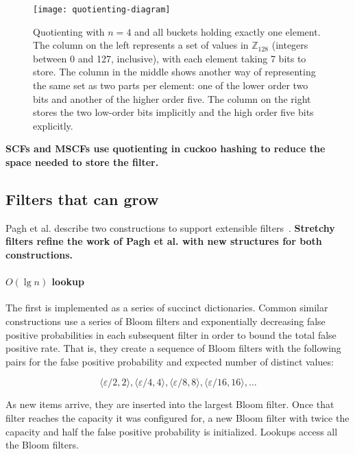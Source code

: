 \documentclass[letterpaper,twocolumn,10pt]{article}
\newcommand{\ints}{\mathbb{Z}}
\newcommand{\etal}{et al.}
\newcommand{\Taffy}{Stretchy}
\newcommand{\TCF}{SCF}
\newcommand{\MTCF}{MSCF}
\newcommand{\Taffy}{Taffy}
\newcommand{\TCF}{TCF}
\newcommand{\MTCF}{MTCF}
\begin{document}
\begin{figure}[b!]
\texttt{[image: quotienting-diagram]}
\caption{\label{quotienting-figure}
Quotienting with $n=4$ and all buckets holding exactly one element.
The column on the left represents a set of values in $\ints_{128}$ (integers between 0 and 127, inclusive), with each element taking 7 bits to store.
The column in the middle shows another way of representing the same set as two parts per element: one of the lower order two bits and another of the higher order five.
The column on the right stores the two low-order bits implicitly and the high order five bits explicitly.
}
\end{figure}

{\bf \TCF{}s and \MTCF{}s use quotienting in cuckoo hashing to reduce the space needed to store the filter.}

\subsection{Filters that can grow}
\label{filters-that-grow}

Pagh \etal{} describe two constructions to support extensible filters~\cite{psw}.
{\bf \Taffy{} filters refine the work of Pagh \etal{} with new structures for both constructions.}

\paragraph{$O(\lg n)$ lookup}
The first is implemented as a series of succinct dictionaries.
Common similar constructions use a series of Bloom filters and exponentially decreasing false positive probabilities in each subsequent filter in order to bound the total false positive rate.
That is, they create a sequence of Bloom filters with the following pairs for the false positive probability and expected number of distinct values:

\[
\langle \varepsilon / 2, 2 \rangle,
 \langle \varepsilon / 4, 4 \rangle,
 \langle \varepsilon / 8, 8 \rangle,
 \langle \varepsilon / 16, 16 \rangle,
 \ldots
\]

As new items arrive, they are inserted into the largest Bloom filter.
Once that filter reaches the capacity it was configured for, a new Bloom filter with twice the capacity and half the false positive probability is initialized.
Lookups access all the Bloom filters.
\end{document}
